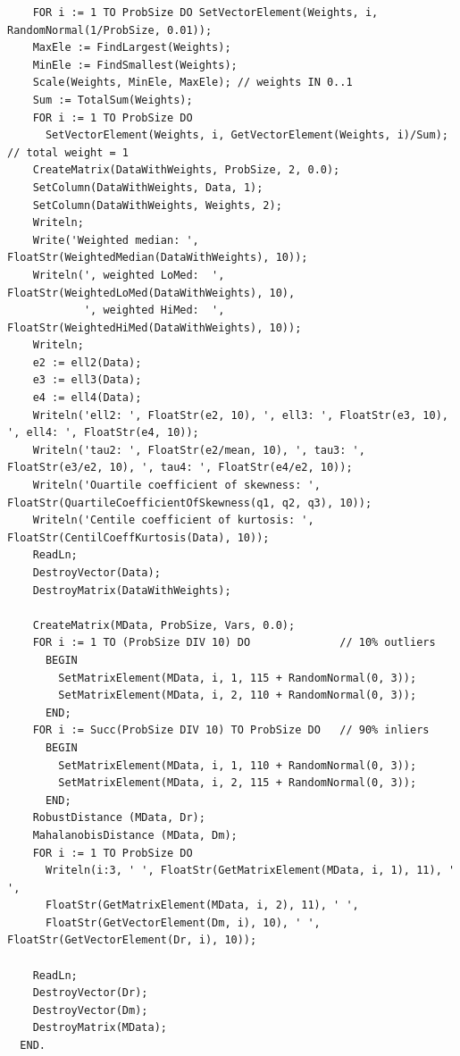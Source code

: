 \begin{refsection}
\begin{lstlisting}
    FOR i := 1 TO ProbSize DO SetVectorElement(Weights, i, RandomNormal(1/ProbSize, 0.01));
    MaxEle := FindLargest(Weights);
    MinEle := FindSmallest(Weights);
    Scale(Weights, MinEle, MaxEle); // weights IN 0..1
    Sum := TotalSum(Weights);
    FOR i := 1 TO ProbSize DO
      SetVectorElement(Weights, i, GetVectorElement(Weights, i)/Sum); // total weight = 1
    CreateMatrix(DataWithWeights, ProbSize, 2, 0.0);
    SetColumn(DataWithWeights, Data, 1);
    SetColumn(DataWithWeights, Weights, 2);
    Writeln;
    Write('Weighted median: ', FloatStr(WeightedMedian(DataWithWeights), 10));
    Writeln(', weighted LoMed:  ', FloatStr(WeightedLoMed(DataWithWeights), 10),
            ', weighted HiMed:  ', FloatStr(WeightedHiMed(DataWithWeights), 10));
    Writeln;
    e2 := ell2(Data);
    e3 := ell3(Data);
    e4 := ell4(Data);
    Writeln('ell2: ', FloatStr(e2, 10), ', ell3: ', FloatStr(e3, 10), ', ell4: ', FloatStr(e4, 10));
    Writeln('tau2: ', FloatStr(e2/mean, 10), ', tau3: ', FloatStr(e3/e2, 10), ', tau4: ', FloatStr(e4/e2, 10));
    Writeln('Ouartile coefficient of skewness: ', FloatStr(QuartileCoefficientOfSkewness(q1, q2, q3), 10));
    Writeln('Centile coefficient of kurtosis: ', FloatStr(CentilCoeffKurtosis(Data), 10));
    ReadLn;
    DestroyVector(Data);
    DestroyMatrix(DataWithWeights);

    CreateMatrix(MData, ProbSize, Vars, 0.0);
    FOR i := 1 TO (ProbSize DIV 10) DO              // 10% outliers
      BEGIN
        SetMatrixElement(MData, i, 1, 115 + RandomNormal(0, 3));
        SetMatrixElement(MData, i, 2, 110 + RandomNormal(0, 3));
      END;
    FOR i := Succ(ProbSize DIV 10) TO ProbSize DO   // 90% inliers
      BEGIN
        SetMatrixElement(MData, i, 1, 110 + RandomNormal(0, 3));
        SetMatrixElement(MData, i, 2, 115 + RandomNormal(0, 3));
      END;
    RobustDistance (MData, Dr);
    MahalanobisDistance (MData, Dm);
    FOR i := 1 TO ProbSize DO
      Writeln(i:3, ' ', FloatStr(GetMatrixElement(MData, i, 1), 11), ' ',
      FloatStr(GetMatrixElement(MData, i, 2), 11), ' ',
      FloatStr(GetVectorElement(Dm, i), 10), ' ', FloatStr(GetVectorElement(Dr, i), 10));

    ReadLn;
    DestroyVector(Dr);
    DestroyVector(Dm);
    DestroyMatrix(MData);
  END.
\end{lstlisting}

\printbibliography[heading=subbibliography]
\end{refsection}
